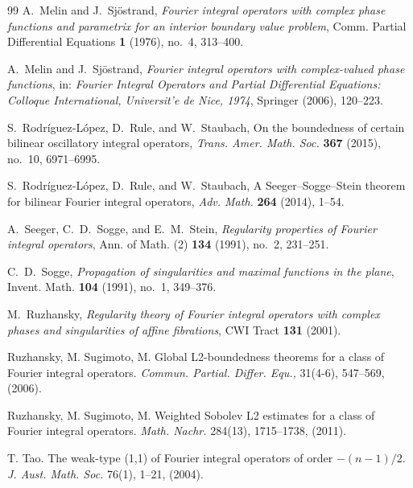 \documentclass[12pt, reqno]{amsart}
\theoremstyle{definition}
\theoremstyle{remark}
\numberwithin{equation}{section}
\begin{document}
\begin{thebibliography}{99}
A.~Melin and J.~Sj{\"o}strand,
\emph{Fourier integral operators with complex phase functions and parametrix for an interior boundary value problem},
Comm. Partial Differential Equations \textbf{1} (1976), no.~4, 313--400.


A.~Melin and J.~Sj\"ostrand,
\emph{Fourier integral operators with complex-valued phase functions},
in: \emph{Fourier Integral Operators and Partial Differential Equations: Colloque International, Universit{'e} de Nice, 1974},
Springer (2006), 120--223.

S.~Rodríguez-López, D.~Rule, and W.~Staubach,
On the boundedness of certain bilinear oscillatory integral operators,
\emph{Trans. Amer. Math. Soc.} \textbf{367} (2015), no.~10, 6971--6995.

S.~Rodríguez-López, D.~Rule, and W.~Staubach,
A Seeger--Sogge--Stein theorem for bilinear Fourier integral operators,
\emph{Adv. Math.} \textbf{264} (2014), 1--54.

A.~Seeger, C.~D.~Sogge, and E.~M.~Stein,
\emph{Regularity properties of Fourier integral operators},
Ann. of Math. (2) \textbf{134} (1991), no.~2, 231--251.

C.~D.~Sogge,
\emph{Propagation of singularities and maximal functions in the plane},
Invent. Math. \textbf{104} (1991), no.~1, 349--376.


M.~Ruzhansky,
\emph{Regularity theory of Fourier integral operators with complex phases and singularities of affine fibrations},
CWI Tract \textbf{131} (2001).

 Ruzhansky, M. Sugimoto, M. Global L2-boundedness theorems for a class of Fourier integral operators. {\it Commun. Partial. Differ. Equ.,} 31(4-6), 547--569, (2006).

 Ruzhansky, M. Sugimoto, M. Weighted Sobolev L2 estimates for a class of Fourier integral operators. {\it Math. Nachr.} 284(13), 1715--1738, (2011).

  T. Tao. The weak-type (1,1) of Fourier integral operators of order $ -(n-1)/2.$ {\it  J. Aust. Math. Soc.} 76(1), 1--21, (2004).

\end{thebibliography}
\end{document}
